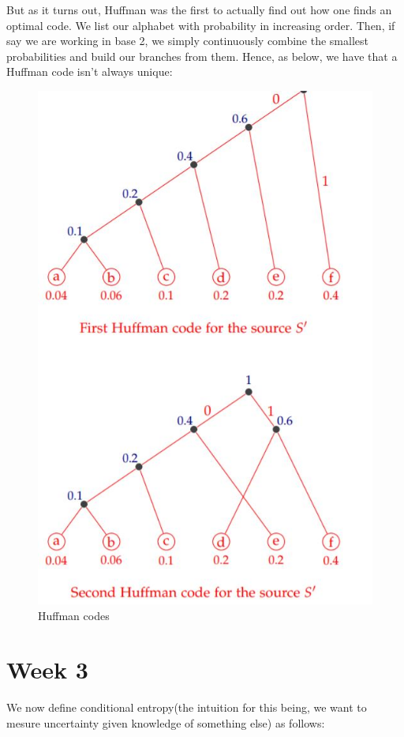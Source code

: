 \documentclass[titlepage]{article}
\begin{document}
But as it turns out, Huffman was the first to actually find out how one finds an optimal code. We list our alphabet with probability in increasing order. Then, if say we are working in base 2, we simply continuously combine the smallest probabilities and build our branches from them. Hence, as below, we have that a Huffman code isn't always unique:

\begin{figure}[H]
    \centering
    \includegraphics[scale = 0.3]{src/huff.JPG}
    \caption{Huffman codes}
    \label{fig:my_label}
\end{figure}

\section{Week 3}
We now define conditional entropy(the intuition for this being, we want to mesure uncertainty given knowledge of something else) as follows:
\end{document}
